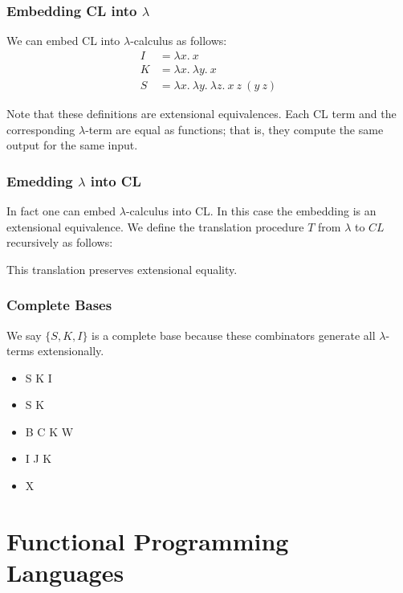 \documentclass{beamer}
\begin{document}
\begin{frame}
	\frametitle{Embedding CL into $\lambda$}

	We can embed CL into $\lambda$-calculus as follows: 
	\begin{align*}
		I &= \lambda x. \ x \\
		K &= \lambda x. \ \lambda y. \ x \\
		S &= \lambda x. \ \lambda y. \ \lambda z. \ x \ z \ (y \ z)
	\end{align*}

	Note that these definitions are extensional equivalences. Each CL term and the corresponding $\lambda$-term are equal as functions; that is, they compute the same output for the same input.
\end{frame}

\begin{frame}
	\frametitle{Emedding $\lambda$ into CL}

	In fact one can embed $\lambda$-calculus into CL. In this case the embedding is an extensional equivalence. We define the translation procedure $T$ from $\lambda$ to $CL$ recursively as follows: 


	This translation preserves extensional equality. 

\end{frame}

\begin{frame}
	\frametitle{Complete Bases}

	We say $\{S,K,I\}$ is a complete base because these combinators generate all $\lambda$-terms extensionally. 

	\begin{itemize}
		\item[] S K I 
		\item[] S K
		\item[] B C K W
		\item[] I J K
		\item[] X %
	\end{itemize}


\end{frame}

\section{Functional Programming Languages}
\end{document}

